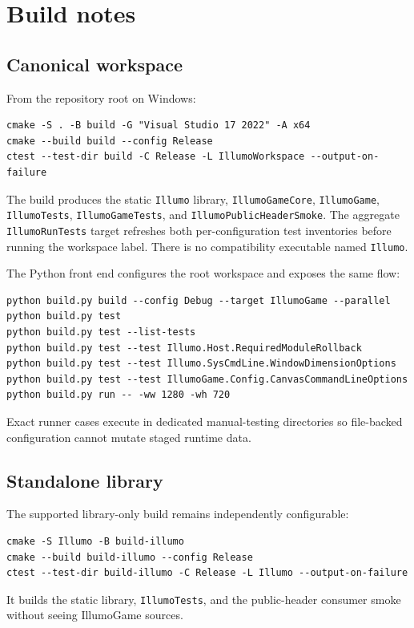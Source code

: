 \clearpage
\section{Build notes}
\label{sec:build}

\subsection{Canonical workspace}
From the repository root on Windows:
\begin{lstlisting}[language={}]
cmake -S . -B build -G "Visual Studio 17 2022" -A x64
cmake --build build --config Release
ctest --test-dir build -C Release -L IllumoWorkspace --output-on-failure
\end{lstlisting}
The build produces the static \texttt{Illumo} library,
\texttt{IllumoGameCore}, \texttt{IllumoGame}, \texttt{IllumoTests},
\texttt{IllumoGameTests}, and \texttt{IllumoPublicHeaderSmoke}. The aggregate
\texttt{IllumoRunTests} target refreshes both per-configuration test inventories
before running the workspace label. There is no compatibility executable named
\texttt{Illumo}.

The Python front end configures the root workspace and exposes the same flow:
\begin{lstlisting}[language={}]
python build.py build --config Debug --target IllumoGame --parallel
python build.py test
python build.py test --list-tests
python build.py test --test Illumo.Host.RequiredModuleRollback
python build.py test --test Illumo.SysCmdLine.WindowDimensionOptions
python build.py test --test IllumoGame.Config.CanvasCommandLineOptions
python build.py run -- -ww 1280 -wh 720
\end{lstlisting}
Exact runner cases execute in dedicated manual-testing directories so file-backed
configuration cannot mutate staged runtime data.

\subsection{Standalone library}
The supported library-only build remains independently configurable:
\begin{lstlisting}[language={}]
cmake -S Illumo -B build-illumo
cmake --build build-illumo --config Release
ctest --test-dir build-illumo -C Release -L Illumo --output-on-failure
\end{lstlisting}
It builds the static library, \texttt{IllumoTests}, and the public-header
consumer smoke without seeing IllumoGame sources.

